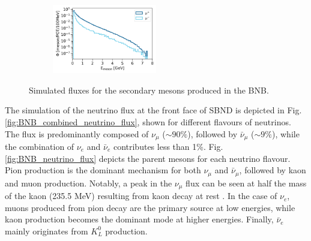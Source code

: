 \begin{figure}[h!]
\begin{subfigure}{.5\linewidth}
\end{subfigure}\\[1ex]
\begin{subfigure}{\linewidth}
\centering
\includegraphics[width=0.5\textwidth]{BNB_Meson_Muon_Flux}
\end{subfigure}
\caption[Simulated Fluxes of Secondary Mesons From the BNB]{
Simulated fluxes for the secondary mesons produced in the BNB. 
}
\label{fig:BNB_Meson_Flux}
\vspace{0.5cm}
\end{figure}

The simulation of the neutrino flux at the front face of SBND is depicted in Fig. \ref{fig:BNB_combined_neutrino_flux}, shown for different flavours of neutrinos. 
The flux is predominantly composed of $\nu_{\mu}$ ($\sim90\%$), followed by $\bar{\nu}_{\mu}$ ($\sim9\%$), while the combination of $\nu_{e}$ and $\bar{\nu}_{e}$ contributes less than 1\%.
Fig. \ref{fig:BNB_neutrino_flux} depicts the parent mesons for each neutrino flavour.
Pion production is the dominant mechanism for both $\nu_{\mu}$ and $\bar{\nu}_{\mu}$, followed by kaon and muon production. 
Notably, a peak in the $\nu_{\mu}$ flux can be seen at half the mass of the kaon (235.5 MeV) resulting from kaon decay at rest \cite{kaonDecayNu}.
In the case of $\nu_{e}$, muons produced from pion decay are the primary source at low energies, while kaon production becomes the dominant mode at higher energies. 
Finally, $\bar{\nu}_{e}$ mainly originates from $K^{0}_{L}$ production.

